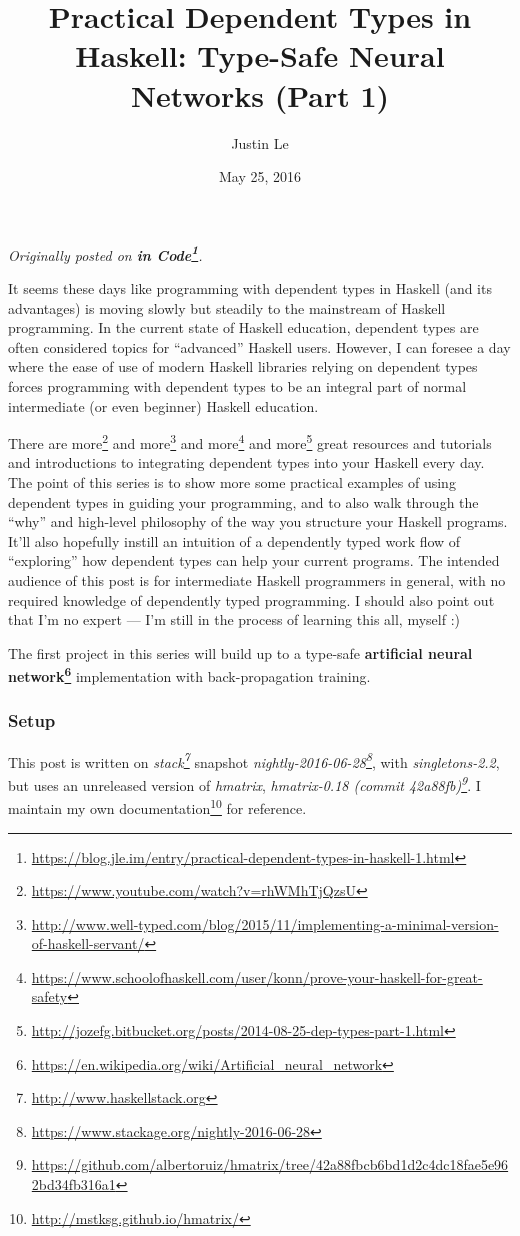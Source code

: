 \documentclass[]{article}
\title{Practical Dependent Types in Haskell: Type-Safe Neural Networks (Part 1)}
\author{Justin Le}
\date{May 25, 2016}
\renewcommand{\href}[2]{#2\footnote{\url{#1}}}
\begin{document}
\maketitle

\emph{Originally posted on
\textbf{\href{https://blog.jle.im/entry/practical-dependent-types-in-haskell-1.html}{in
Code}}.}

It seems these days like programming with dependent types in Haskell (and its
advantages) is moving slowly but steadily to the mainstream of Haskell
programming. In the current state of Haskell education, dependent types are
often considered topics for ``advanced'' Haskell users. However, I can foresee a
day where the ease of use of modern Haskell libraries relying on dependent types
forces programming with dependent types to be an integral part of normal
intermediate (or even beginner) Haskell education.

There are \href{https://www.youtube.com/watch?v=rhWMhTjQzsU}{more} and
\href{http://www.well-typed.com/blog/2015/11/implementing-a-minimal-version-of-haskell-servant/}{more}
and
\href{https://www.schoolofhaskell.com/user/konn/prove-your-haskell-for-great-safety}{more}
and
\href{http://jozefg.bitbucket.org/posts/2014-08-25-dep-types-part-1.html}{more}
great resources and tutorials and introductions to integrating dependent types
into your Haskell every day. The point of this series is to show more some
practical examples of using dependent types in guiding your programming, and to
also walk through the ``why'' and high-level philosophy of the way you structure
your Haskell programs. It'll also hopefully instill an intuition of a
dependently typed work flow of ``exploring'' how dependent types can help your
current programs. The intended audience of this post is for intermediate Haskell
programmers in general, with no required knowledge of dependently typed
programming. I should also point out that I'm no expert --- I'm still in the
process of learning this all, myself :)

The first project in this series will build up to a type-safe
\textbf{\href{https://en.wikipedia.org/wiki/Artificial_neural_network}{artificial
neural network}} implementation with back-propagation training.

\subsubsection{Setup}\label{setup}

This post is written on \emph{\href{http://www.haskellstack.org}{stack}}
snapshot
\emph{\href{https://www.stackage.org/nightly-2016-06-28}{nightly-2016-06-28}},
with \emph{singletons-2.2}, but uses an unreleased version of \emph{hmatrix},
\emph{\href{https://github.com/albertoruiz/hmatrix/tree/42a88fbcb6bd1d2c4dc18fae5e962bd34fb316a1}{hmatrix-0.18
(commit 42a88fb)}}. I \href{http://mstksg.github.io/hmatrix/}{maintain my own
documentation} for reference.
\end{document}
